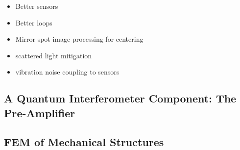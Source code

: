 \begin{itemize}
\item Better sensors
\item Better loops
\item Mirror spot image processing for centering
\item scattered light mitigation
\item vibration noise coupling to sensors
\end{itemize}


\subsection{A Quantum Interferometer Component: The Pre-Amplifier}


\subsection{FEM of Mechanical Structures}


